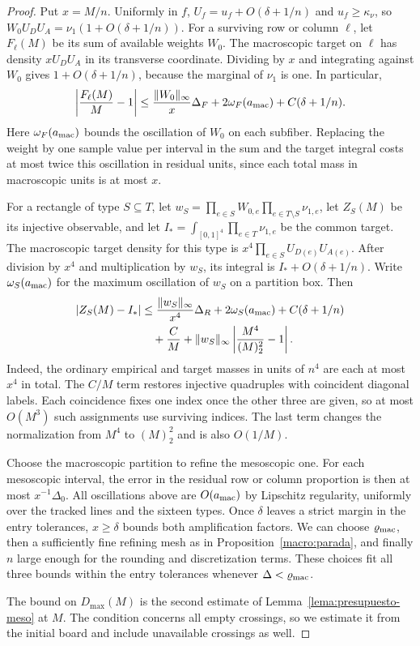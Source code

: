 \begin{proof}
Put $x=M/n$. Uniformly in $f$, $U_f=u_f+O(\delta+1/n)$ and $u_f\ge\kappa_\nu$, so
$W_0U_DU_A=\nu_1(1+O(\delta+1/n))$. For a surviving row or column $\ell$, let $F_\ell(M)$ be its
sum of available weights $W_0$. The macroscopic target on $\ell$ has density $xU_DU_A$ in its
transverse coordinate. Dividing by $x$ and integrating against $W_0$ gives $1+O(\delta+1/n)$,
because the marginal of $\nu_1$ is one. In particular,
\[
 \left|\frac{F_\ell(M)}M-1\right|
 \le \frac{\|W_0\|_\infty}{x}\Delta_F+2\omega_F(a_{\rm mac})+C(\delta+1/n).
\]
Here $\omega_F(a_{\rm mac})$ bounds the oscillation of $W_0$ on each subfiber. Replacing the weight
by one sample value per interval in the sum and the target integral costs at most twice this
oscillation in residual units, since each total mass in macroscopic units is at most $x$.

For a rectangle of type $S\subseteq T$, let $w_S=\prod_{e\in S}W_{0,e}\prod_{e\in T\setminus S}\nu_{1,e}$,
let $Z_S(M)$ be its injective observable, and let $I_*=\int_{[0,1]^4}\prod_{e\in T}\nu_{1,e}$
be the common target. The macroscopic target density for this type is
$x^4\prod_{e\in S}U_{D(e)}U_{A(e)}$. After division by $x^4$ and multiplication by $w_S$, its
integral is $I_*+O(\delta+1/n)$. Write $\omega_S(a_{\rm mac})$ for the maximum oscillation of $w_S$
on a partition box. Then
\begin{align*}
 |Z_S(M)-I_*|
 &\le \frac{\|w_S\|_\infty}{x^4}\Delta_R+2\omega_S(a_{\rm mac})+C(\delta+1/n)\\
 &\quad +\frac{C}{M}+\|w_S\|_\infty\left|\frac{M^4}{(M)_2^2}-1\right| .
\end{align*}
Indeed, the ordinary empirical and target masses in units of $n^4$ are each at most $x^4$ in total.
The $C/M$ term restores injective quadruples with coincident diagonal labels. Each coincidence fixes
one index once the other three are given, so at most $O(M^3)$ such assignments use surviving indices.
The last term changes the normalization from $M^4$ to $(M)_2^2$ and is also $O(1/M)$.

Choose the macroscopic partition to refine the mesoscopic one. For each mesoscopic interval, the
error in the residual row or column proportion is then at most $x^{-1}\Delta_0$. All oscillations
above are $O(a_{\rm mac})$ by Lipschitz regularity, uniformly over the tracked lines and the sixteen
types. Once $\delta$ leaves a strict margin in the entry tolerances, $x\ge\delta$ bounds both
amplification factors. We can choose $\varrho_{\rm mac}$, then a sufficiently fine refining mesh
as in Proposition~\ref{macro:parada}, and finally $n$ large enough for the rounding and
discretization terms. These choices fit all three bounds within the entry tolerances whenever
$\Delta<\varrho_{\rm mac}$.

The bound on $D_{\max}(M)$ is the second estimate of Lemma~\ref{lema:presupuesto-meso} at $M$. The
condition concerns all empty crossings, so we estimate it from the initial board and include unavailable
crossings as well.
\end{proof}

